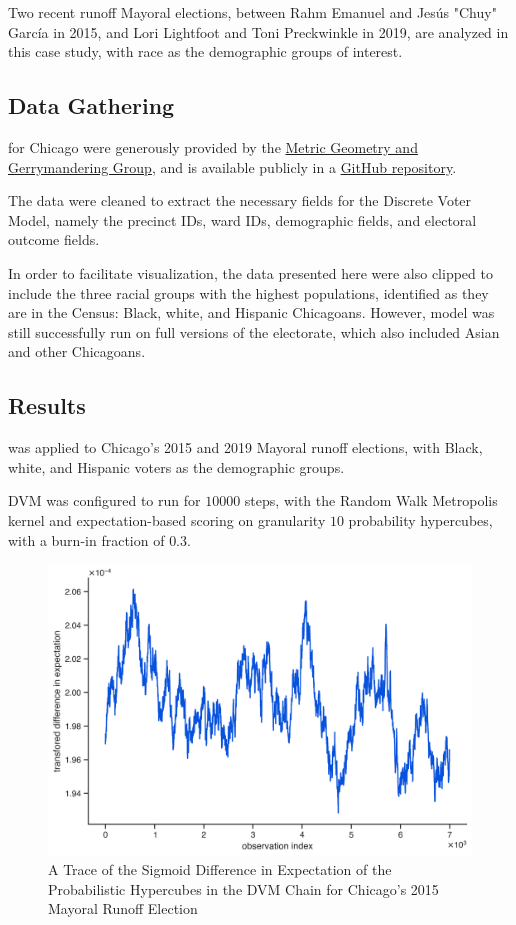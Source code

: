 Two recent runoff Mayoral elections, between Rahm Emanuel and Jesús "Chuy" García in 2015, and Lori Lightfoot and Toni Preckwinkle in 2019, are analyzed in this case study, with race as the demographic groups of interest.

\FloatBarrier
\subsection{Data Gathering}

 for Chicago were generously provided by the \href{https://mggg.org/chicago}{Metric Geometry and Gerrymandering Group}, and is available publicly in a \href{https://github.com/mggg/chicago}{GitHub repository}.

The data were cleaned to extract the necessary fields for the Discrete Voter Model, namely the precinct IDs, ward IDs, demographic fields, and electoral outcome fields.

In order to facilitate visualization, the data presented here were also clipped to include the three racial groups with the highest populations, identified as they are in the Census: Black, white, and Hispanic Chicagoans. However, model was still successfully run on full versions of the electorate, which also included Asian and other Chicagoans.


\subsection{Results}

 was applied to Chicago's 2015 and 2019 Mayoral runoff elections, with Black, white, and Hispanic voters as the demographic groups.

DVM was configured to run for $10000$ steps, with the Random Walk Metropolis kernel and expectation-based scoring on granularity $10$ probability hypercubes, with a burn-in fraction of $0.3$.

\begin{figure}[ht]\centering
 \includegraphics[width=\linewidth]{figures/cm_2015_ward_trace_plot.png}
 \caption{A Trace of the Sigmoid Difference in Expectation of the Probabilistic Hypercubes in the DVM Chain for Chicago's 2015 Mayoral Runoff Election}
 \label{fig:chi_cm_2015_trace}
\end{figure}

